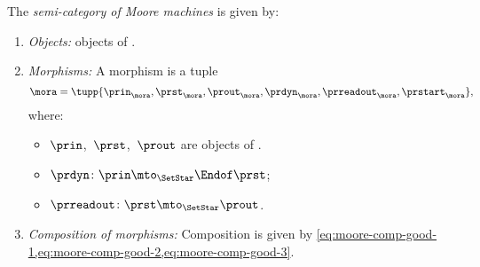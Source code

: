 \begin{definition}[\Moore]
    \label{def:Moore}
    The \emph{semi-category of Moore machines} \Moore is given by:
    \begin{enumerate}
        \item \emph{Objects:} objects of \SetStar.
        \item \emph{Morphisms:} A morphism is a tuple
              \begin{equation}
                  \mora = \tupp{\prin_{\mora},\prst_{\mora},\prout_{\mora},\prdyn_{\mora},\prreadout_{\mora},\prstart_{\mora}},
              \end{equation}
              where:
              \begin{itemize}
                  \item $\prin$,~$\prst$,~$\prout$ are objects of \SetStar.
                  \item $ \prdyn \colon \prin \mto_\SetStar  \Endof \prst$;
                  \item $ \prreadout \colon \prst  \mto_\SetStar \prout$.
              \end{itemize}
        \item \emph{Composition of morphisms:} Composition is given by
              \cref{eq:moore-comp-good-1,eq:moore-comp-good-2,eq:moore-comp-good-3}.
    \end{enumerate}
\end{definition}

